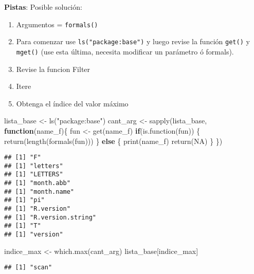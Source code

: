 \documentclass[
]{article}
\newenvironment{Shaded}{\begin{snugshade}}{\end{snugshade}}
\newcommand{\ConstantTok}[1]{\textcolor[rgb]{0.00,0.00,0.00}{#1}}
\newcommand{\ControlFlowTok}[1]{\textcolor[rgb]{0.13,0.29,0.53}{\textbf{#1}}}
\newcommand{\FunctionTok}[1]{\textcolor[rgb]{0.00,0.00,0.00}{#1}}
\newcommand{\NormalTok}[1]{#1}
\newcommand{\OtherTok}[1]{\textcolor[rgb]{0.56,0.35,0.01}{#1}}
\newcommand{\StringTok}[1]{\textcolor[rgb]{0.31,0.60,0.02}{#1}}
\providecommand{\tightlist}{%
  \setlength{\itemsep}{0pt}\setlength{\parskip}{0pt}}
\begin{document}
\textbf{Pistas}: Posible solución:

\begin{enumerate}
\def\labelenumi{\arabic{enumi}.}
\setcounter{enumi}{-1}
\tightlist
\item
  Argumentos = \texttt{formals()}
\item
  Para comenzar use \texttt{ls("package:base")} y luego revise la
  función \texttt{get()} y \texttt{mget()} (use esta última, necesita
  modificar un parámetro ó formals).
\item
  Revise la funcion Filter
\item
  Itere
\item
  Obtenga el índice del valor máximo
\end{enumerate}

\begin{Shaded}
\begin{Highlighting}[]
\NormalTok{  lista\_base }\OtherTok{\textless{}{-}} \FunctionTok{ls}\NormalTok{(}\StringTok{"package:base"}\NormalTok{)}
\NormalTok{  cant\_arg }\OtherTok{\textless{}{-}} \FunctionTok{sapply}\NormalTok{(lista\_base, }\ControlFlowTok{function}\NormalTok{(name\_f)\{}
\NormalTok{    fun }\OtherTok{\textless{}{-}} \FunctionTok{get}\NormalTok{(name\_f)}
    \ControlFlowTok{if}\NormalTok{(}\FunctionTok{is.function}\NormalTok{(fun)) \{}
      \FunctionTok{return}\NormalTok{(}\FunctionTok{length}\NormalTok{(}\FunctionTok{formals}\NormalTok{(fun)))}
\NormalTok{    \} }\ControlFlowTok{else}\NormalTok{ \{}
      \FunctionTok{print}\NormalTok{(name\_f)}
      \FunctionTok{return}\NormalTok{(}\ConstantTok{NA}\NormalTok{)}
\NormalTok{    \}}
\NormalTok{  \})}
\end{Highlighting}
\end{Shaded}

\begin{verbatim}
## [1] "F"
## [1] "letters"
## [1] "LETTERS"
## [1] "month.abb"
## [1] "month.name"
## [1] "pi"
## [1] "R.version"
## [1] "R.version.string"
## [1] "T"
## [1] "version"
\end{verbatim}

\begin{Shaded}
\begin{Highlighting}[]
\NormalTok{  indice\_max }\OtherTok{\textless{}{-}} \FunctionTok{which.max}\NormalTok{(cant\_arg)}
\NormalTok{  lista\_base[indice\_max]}
\end{Highlighting}
\end{Shaded}

\begin{verbatim}
## [1] "scan"
\end{verbatim}
\end{document}
